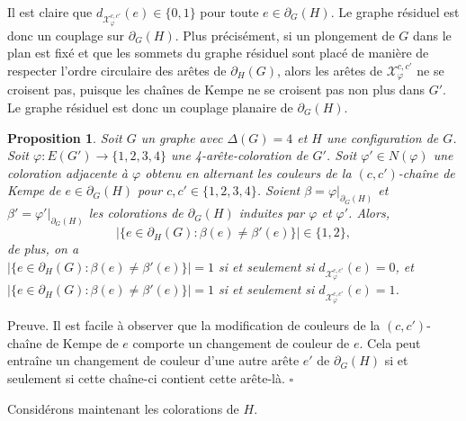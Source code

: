 \documentclass[10pt,a4paper]{article}
\newtheorem{proposition}{Proposition}
\newcommand{\ep}{{\hfill $\square$}}
\begin{document}
Il est claire que $d_{\mathcal{X}_{\varphi}^{c,c'}}(e)\in\{0,1\}$ pour toute $e\in \partial_G(H)$. Le graphe résiduel est donc un couplage sur $\partial_G(H)$. Plus précisément, si un plongement de $G$ dans le plan est fixé et que les sommets du graphe résiduel sont placé de manière de respecter l'ordre circulaire des arêtes de $\partial_H(G)$, alors les arêtes de $\mathcal{X}_{\varphi}^{c,c'}$ ne se croisent pas, puisque les chaînes de Kempe ne se croisent pas non plus dans $G'$. Le graphe résiduel est donc un couplage planaire de $\partial_G(H)$.

\begin{proposition}
Soit $G$ un graphe avec $\Delta(G)=4$ et $H$ une configuration de $G$.
Soit $\varphi:E(G')\to \{1,2,3,4\}$ une 4-arête-coloration de $G'$. 
Soit $\varphi' \in N(\varphi)$ une coloration adjacente à $\varphi$ obtenu en alternant les couleurs de la $(c,c')$-chaîne de Kempe de $e\in \partial_G(H)$ pour $c,c'\in\{1,2,3,4\}$.
Soient $\beta = \varphi|_{\partial_G(H)}$ et $\beta' = \varphi'|_{\partial_G(H)}$ les colorations de  $\partial_G(H)$ induites par $\varphi$ et $\varphi'$. Alors,
$$
|\{e\in \partial_H(G) : \beta(e)\ne \beta'(e)\}| \in \{1,2\},
$$
de plus, on a \\
$|\{e\in \partial_H(G) : \beta(e)\ne \beta'(e)\}|=1$ si et seulement si $d_{\mathcal{X}_{\varphi}^{c,c'}}(e)=0$, et \\
$|\{e\in \partial_H(G) : \beta(e)\ne \beta'(e)\}|=1$ si et seulement si $d_{\mathcal{X}_{\varphi}^{c,c'}}(e)=1$. 
\end{proposition}

Preuve. Il est facile à observer que la modification de couleurs de la $(c,c')$-chaîne de Kempe de $e$ comporte un changement de couleur de $e$. Cela peut entraîne un changement de couleur d'une autre arête $e'$  de $\partial_G(H)$ si et seulement si cette chaîne-ci contient cette arête-là. \ep


Considérons maintenant les colorations de $H$.
  
\end{document}
